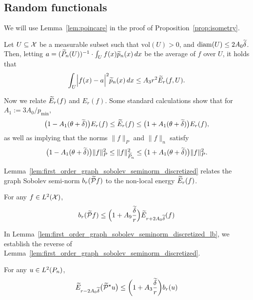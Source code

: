 \subsection{Random functionals}
\label{subsec:random_functionals}

We will use Lemma~\ref{lem:poincare} in the proof of Proposition~\ref{prop:isometry}. 
\begin{lemma}
	\label{lem:poincare}
	Let $U \subseteq \mathcal{X}$ be a measurable subset such that $\mathrm{vol}(U) > 0$, and $\mathrm{diam}(U) \leq 2A_0\widetilde{\delta}$. Then, letting $a = (\widetilde{P}_n(U))^{-1} \cdot \int_{U} f(x) \widetilde{p}_n(x) \,dx$ be the average of $f$ over $U$, it holds that
	\begin{equation*}
	\int_{U} \Bigl|f(x)-a\Bigr|^2 \widetilde{p}_n(x)\,dx \leq A_3 r^2 \widetilde{E}_r(f,U).
	\end{equation*}
\end{lemma}

Now we relate $\widetilde{E}_r(f)$ and $E_r(f)$. Some standard calculations show that for $A_1 := 3A_0/p_{\min}$,
\begin{equation}
\label{eqn:calder19_1}
\bigl(1 - A_1(\theta + \widetilde{\delta})\bigr) E_r(f) \leq \widetilde{E}_r(f) \leq \bigl(1 + A_1(\theta + \widetilde{\delta})\bigr) E_r(f),
\end{equation}
as well as implying that the norms $\|f\|_{P}$ and $\|f\|_{n}$ satisfy
\begin{equation}
\label{eqn:calder19_2}
\bigl(1 - A_1(\theta + \widetilde{\delta})\bigr) \|f\|_{P}^2 \leq \|f\|_{\widetilde{P}_n}^2 \leq \bigl(1 + A_1(\theta + \widetilde{\delta})\bigr) \|f\|_{P}^2.
\end{equation}

Lemma~\ref{lem:first_order_graph_sobolev_seminorm_discretized} relates the graph Sobolev semi-norm $b_r(\widetilde{\mathcal{P}}f)$ to the non-local energy $\widetilde{E}_r(f)$. 
\begin{lemma}
	\label{lem:first_order_graph_sobolev_seminorm_discretized}
	For any $f \in L^2(\mathcal{X})$,
	\begin{equation*}
	b_r(\widetilde{\mathcal{P}}f) \leq \Bigl(1 + A_9\frac{\widetilde{\delta}}{r}\Bigr) \widetilde{E}_{r + 2A_0\widetilde{\delta}}(f)
	\end{equation*}
\end{lemma}

In Lemma~\ref{lem:first_order_graph_sobolev_seminorm_discretized_lb}, we establish the reverse of Lemma~\ref{lem:first_order_graph_sobolev_seminorm_discretized}. 
\begin{lemma}
	\label{lem:first_order_graph_sobolev_seminorm_discretized_lb}
	For any $u \in L^2(P_n)$, 
	\begin{equation*}
	\widetilde{E}_{r - 2A_0\widetilde{\delta}}\bigl(\widetilde{\mathcal{P}}^{\star}u\bigr) \leq \biggl(1 + A_3\frac{\widetilde{\delta}}{r}\biggr) b_{r}(u)
	\end{equation*}
\end{lemma}

